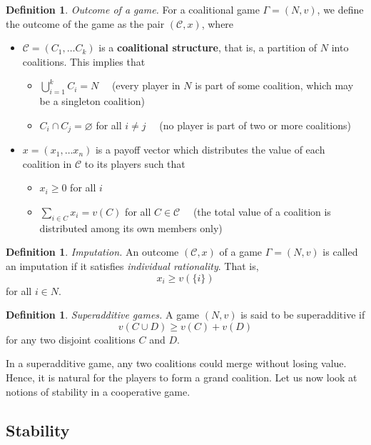 \documentclass{article}
\theoremstyle{definition}
\newtheorem{defn}[theorem]{Definition}
\begin{document}
\begin{defn}
\textit{Outcome of a game.} For a coalitional game $\Gamma = (N,v)$, we define the outcome of the game as the pair $(\mathcal{C}, x)$, where 
\begin{itemize}
    \item $\mathcal{C} = (C_1, \ldots C_k)$ is a \textbf{coalitional structure}, that is, a partition of $N$ into coalitions. This implies that 
    \begin{itemize}
        \item $\bigcup\limits_{i=1}^{k} C_i = N \quad$ (every player in $N$ is part of some coalition, which may be a singleton coalition)
        \item $C_i \cap C_j = \varnothing$ for all $i \neq j \quad$ (no player is part of two or more coalitions)
    \end{itemize}
    \item $x = (x_1, \ldots x_n)$ is a payoff vector which distributes the value of each coalition in $\mathcal{C}$ to its players such that 
    \begin{itemize}
        \item $x_i \geq 0$ for all $i$
        \item $\sum\limits_{i \in C} x_i = v(C)$ for all $C \in \mathcal{C} \quad$ (the total value of a coalition is distributed among its own members only)
    \end{itemize}
\end{itemize}
\end{defn}

\begin{defn}
\textit{Imputation.} An outcome $(\mathcal{C}, x)$ of a game $\Gamma = (N,v)$ is called an imputation if it satisfies \textit{individual rationality}. That is,
\[
    x_i \geq v\left( \{i\} \right) 
\]
for all $i \in N$.
\end{defn}

\begin{defn}
\textit{Superadditive games.} A game $(N,v)$ is said to be superadditive if 
\[
    v\left( C \cup D \right) \geq v(C) + v(D)
\]
for any two disjoint coalitions $C$ and $D$. 
\end{defn}
In a superadditive game, any two coalitions could merge without losing value. Hence, it is natural for the players to form a grand coalition. Let us now look at notions of stability in a cooperative game. 

\subsection{Stability}
\end{document}

